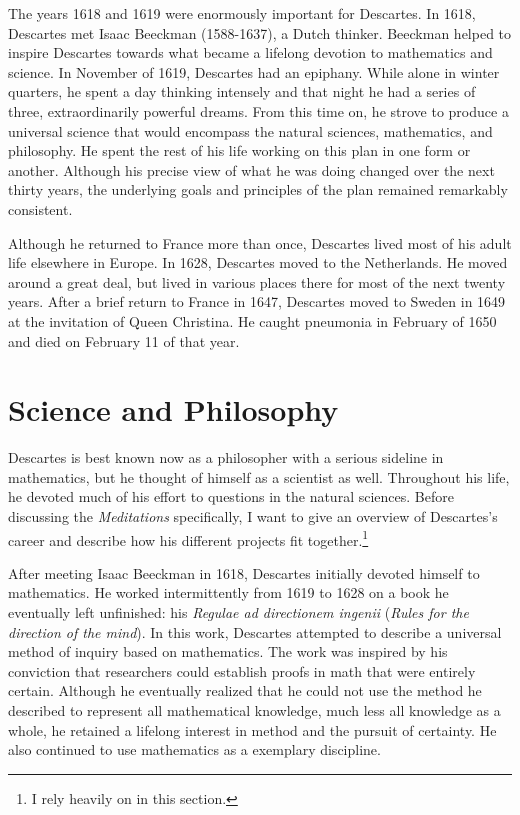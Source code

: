 The years 1618 and 1619 were enormously important for Descartes. In 1618, Descartes met Isaac Beeckman (1588-1637), a Dutch thinker. Beeckman helped to inspire Descartes towards what became a lifelong devotion to mathematics and science. In November of 1619, Descartes had an epiphany. While alone in winter quarters, he spent a day thinking intensely and that night he had a series of three, extraordinarily powerful dreams. From this time on, he strove to produce a universal science that would encompass the natural sciences, mathematics, and philosophy. He spent the rest of his life working on this plan in one form or another. Although his precise view of what he was doing changed over the next thirty years, the underlying goals and principles of the plan remained remarkably consistent.

Although he returned to France more than once, Descartes lived most of his adult life elsewhere in Europe. In 1628, Descartes moved to the Netherlands. He moved around a great deal, but lived in various places there for most of the next twenty years. After a brief return to France in 1647, Descartes moved to Sweden in 1649 at the invitation of Queen Christina. He caught pneumonia in February of 1650 and died on February 11 of that year.

\section*{Science and Philosophy}

Descartes is best known now as a philosopher with a serious sideline in mathematics, but he thought of himself as a scientist as well. Throughout his life, he devoted much of his effort to questions in the natural sciences. Before discussing the \textit{Meditations} specifically, I want to give an overview of Descartes's career and describe how his different projects fit together.\footnote{I rely heavily on \cite{gaukroger2011} in this section.}

After meeting Isaac Beeckman in 1618, Descartes initially devoted himself to mathematics. He worked intermittently from 1619 to 1628 on a book he eventually left unfinished: his \textit{Regulae ad directionem ingenii} (\textit{Rules for the direction of the mind}). In this work, Descartes attempted to describe a universal method of inquiry based on mathematics. The work was inspired by his conviction that researchers could establish proofs in math that were entirely certain. Although he eventually realized that he could not use the method he described to represent all mathematical knowledge, much less all knowledge as a whole, he retained a lifelong interest in method and the pursuit of certainty. He also continued to use mathematics as a exemplary discipline.

